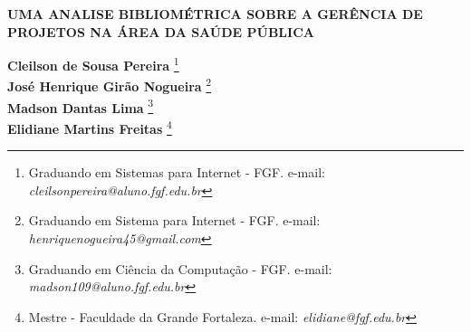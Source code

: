 \documentclass[12pt]{article}
\begin{document}

%



\begin{center}
\textbf{\Large{UMA ANALISE BIBLIOMÉTRICA SOBRE A GERÊNCIA DE PROJETOS NA ÁREA DA SAÚDE PÚBLICA}}\\
\end{center}

\vspace*{0.2cm}

\begin{flushright}
 {\bf Cleilson de Sousa Pereira} \footnote[1]{Graduando em Sistemas para Internet - FGF. e-mail: \it cleilsonpereira@aluno.fgf.edu.br}  \\
 {\bf José Henrique Girão Nogueira} \footnote[2]{Graduando em Sistema para Internet - FGF. e-mail: \it henriquenogueira45@gmail.com}  \\
  {\bf Madson Dantas Lima} \footnote[3]{Graduando em Ciência da Computação - FGF. e-mail: \it madson109@aluno.fgf.edu.br}  \\
   {\bf Elidiane Martins Freitas} \footnote[4]{Mestre - Faculdade da Grande Fortaleza. e-mail: \it elidiane@fgf.edu.br}   \\
\end{flushright}

\vspace*{0.5cm}

\end{document}
